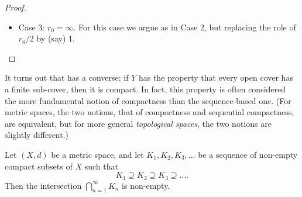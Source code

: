 \begin{proof}
\begin{itemize}
          We now construct a sequence \(y^{(1)}, y^{(2)}, \dots\) by the following recursive procedure.
          We let \(y^{(1)}\) be any point in \(Y\).
          The ball \(B_{(X, d)}(y^{(1)}, r_0 / 2)\) is contained in one of the \(V_{\alpha}\) and thus cannot cover all of \(Y\), since we would then obtain a finite cover, a contradiction.
          Thus, there exists a point \(y^{(2)}\) which does not lie in \(B_{(X, d)}(y^{(1)}, r_0 / 2)\), so, in particular, \(d(y^{(2)}, y^{(1)}) \geq r_0 / 2\).
          Choose such a point \(y^{(2)}\).
          The set \(B_{(X, d)}(y^{(1)}, r_0 / 2) \cup B_{(X, d)}(y^{(2)}, r_0 / 2)\) cannot cover all of \(Y\), since we would then obtain two sets \(V_{\alpha_1}\) and \(V_{\alpha_2}\) which covered \(Y\), a contradiction again.
          So we can choose a point \(y^{(3)}\) which does not lie in \(B_{(X, d)}(y^{(1)}, r_0 / 2) \cup B_{(X, d)}(y^{(2)}, r_0 / 2)\), so, in particular, \(d(y^{(3)}, y^{(1)}) \geq r_0 / 2\) and \(d(y^{(3)}, y^{(2)}) \geq r_0 / 2\).
          Continuing in this fashion we obtain a sequence \((y^{(n)})_{n = 1}^\infty\) in \(Y\) with the property that \(d(y^{(k)}, y^{(j)}) \geq r_0 / 2\) for all \(k > j\).
          In particular, the sequence \((y^{(n)})_{n = 1}^\infty\) is not a Cauchy sequence, and in fact no subsequence of \((y^{(n)})_{n = 1}^\infty\) can be a Cauchy sequence either.
          But this contradicts the assumption that \((Y, d|_{Y \times Y})\) is compact (by ).
    \item Case 3:
          \(r_0 = \infty\).
          For this case we argue as in Case 2, but replacing the role of \(r_0 / 2\) by (say) \(1\).
  \end{itemize}
\end{proof}

\begin{note}
  It turns out that  has a converse:
  if \(Y\) has the property that every open cover has a finite sub-cover, then it is compact.
  In fact, this property is often considered the more fundamental notion of compactness than the sequence-based one.
  (For metric spaces, the two notions, that of compactness and sequential compactness, are equivalent, but for more general \emph{topological spaces}, the two notions are slightly diﬀerent.)
\end{note}

\begin{cor}\label{ii:1.5.9}
  Let \((X, d)\) be a metric space, and let \(K_1, K_2, K_3, \dots\) be a sequence of non-empty compact subsets of \(X\) such that
  \[
    K_1 \supseteq K_2 \supseteq K_3 \supseteq \dots.
  \]
  Then the intersection \(\bigcap_{n = 1}^\infty K_n\) is non-empty.
\end{cor}

